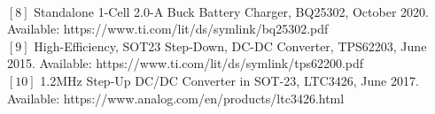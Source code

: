 \\ 
$[8]$ Standalone 1-Cell 2.0-A Buck Battery Charger, BQ25302, October 2020. Available: https://www.ti.com/lit/ds/symlink/bq25302.pdf\vspace{3.5pt}
\\ 
$[9]$ High-Efficiency, SOT23 Step-Down, DC-DC Converter, TPS62203, June 2015. Available: https://www.ti.com/lit/ds/symlink/tps62200.pdf
\vspace{3.5pt}
\\ 
$[10]$ 1.2MHz Step-Up DC/DC
Converter in SOT-23, LTC3426, June 2017. Available: https://www.analog.com/en/products/ltc3426.html

